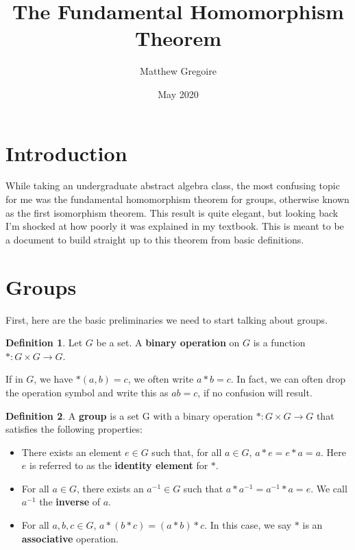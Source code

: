 \documentclass{article}
\title{The Fundamental Homomorphism Theorem}
\author{Matthew Gregoire}
\date{May 2020}
\newcommand{\inv}[1]{#1^{-1}}
\theoremstyle{definition}
\newtheorem{definition}{Definition}[section]
\begin{document}
\maketitle

\tableofcontents

\pagebreak

\section{Introduction}

While taking an undergraduate abstract algebra class, the most confusing topic for me was the fundamental homomorphism theorem for groups, otherwise known as the first isomorphism theorem. This result is quite elegant, but looking back I'm shocked at how poorly it was explained in my textbook. This is meant to be a document to build straight up to this theorem from basic definitions.

\section{Groups}

First, here are the basic preliminaries we need to start talking about groups.

\theoremstyle{definition}
\begin{definition}{}
Let $G$ be a set. A \textbf{binary operation} on $G$ is a function $*: G \times G \to G$.
\end{definition}

If in $G$, we have $*(a, b) = c$, we often write $a * b = c$. In fact, we can often drop the operation symbol and write this as $ab = c$, if no confusion will result.


\theoremstyle{definition}
\begin{definition}{}
A \textbf{group} is a set G with a binary operation $*: G \times G \to G$ that satisfies the following properties:
\begin{itemize}
    \item There exists an element $e \in G$ such that, for all $a \in G$, $a*e = e*a = a$. Here $e$ is referred to as the \textbf{identity element} for $*$.
    \item For all $a \in G$, there exists an $\inv{a} \in G$ such that $a*\inv{a} = \inv{a}*a = e$. We call $\inv{a}$ the \textbf{inverse} of $a$.
    \item For all $a, b, c \in G$, $a * (b * c) = (a * b) * c$. In this case, we say $*$ is an \textbf{associative} operation.
\end{itemize}
\end{definition}
\end{document}
